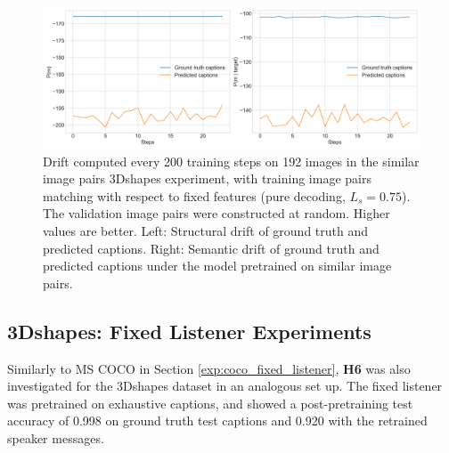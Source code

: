 \begin{figure}[h]
	\centering
	\includegraphics[width=\linewidth]{images/3dshapes_baseline_structural_semantic_drift_49_pure_075_similarFixed.png}
	\caption{Drift computed every 200 training steps on 192 images in the similar image pairs 3Dshapes experiment, with training image pairs matching with respect to fixed features (pure decoding, $L_s = 0.75$). The validation image pairs were constructed at random. Higher values are better. Left: Structural drift of ground truth and predicted captions. Right: Semantic drift of ground truth and predicted captions under the model pretrained on similar image pairs.} 
	\label{fig:3dshapes_similarFixed_075_str_sem_drift}
\end{figure}



\subsection{3Dshapes: Fixed Listener Experiments}

Similarly to MS COCO in Section \ref{exp:coco_fixed_listener}, \textbf{H6} was also investigated for the 3Dshapes dataset in an analogous set up. The fixed listener was pretrained on exhaustive captions, and showed a post-pretraining test accuracy of 0.998 on ground truth test captions and 0.920 with the retrained speaker messages. 

